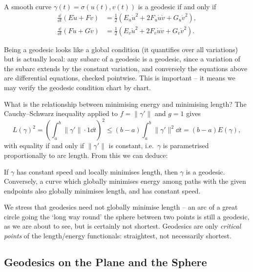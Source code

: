 \documentclass[a4paper]{scrartcl}
\begin{document}
\begin{corollary}
    A smooth curve $\gamma(t) = \sigma(u(t), v(t))$ is a geodesic if and only if
    \begin{align*}
        \frac{\dd}{\dd t}\left(E \dot u + F \dot v\right) &= \frac{1}{2}\left(E_u \dot u^2 + 2F_u \dot u \dot v + G_u \dot v^2\right), \\
        \frac{\dd}{\dd t}\left(F \dot u + G \dot v\right) &= \frac{1}{2}\left(E_v \dot u^2 + 2 F_v \dot u \dot v + G_v \dot v^2\right).
    \end{align*}
\end{corollary}

\begin{remark}
    Being a geodesic looks like a global condition (it quantifies over all variations) but is actually local: any subarc of a geodesic is a geodesic, since a variation of the subarc extends by the constant variation, and conversely the equations above are differential equations, checked pointwise. This is important -- it means we may verify the geodesic condition chart by chart.
\end{remark}

What is the relationship between minimising energy and minimising length? The Cauchy--Schwarz inequality applied to $f = \|\gamma'\|$ and $g = 1$ gives
$$
L(\gamma)^2 = \left(\int_a^b \|\gamma'\| \cdot 1 \dd t\right)^2 \leq (b - a)\int_a^b \|\gamma'\|^2 \dd t = (b - a) E(\gamma),
$$
with equality if and only if $\|\gamma'\|$ is constant, i.e.\ $\gamma$ is parametrised proportionally to arc length. From this we can deduce:

\begin{corollary}
    If $\gamma$ has constant speed and locally minimises length, then $\gamma$ is a geodesic. Conversely, a curve which globally minimises energy among paths with the given endpoints also globally minimises length, and has constant speed.
\end{corollary}

We stress that geodesics need not globally minimise length -- an arc of a great circle going the `long way round' the sphere between two points is still a geodesic, as we are about to see, but is certainly not shortest. Geodesics are only \emph{critical points} of the length/energy functionals: straightest, not necessarily shortest.

\subsection{Geodesics on the Plane and the Sphere}
\end{document}
